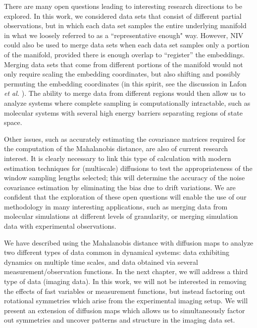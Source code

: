 There are many open questions leading to interesting research directions to be explored.
%
In this work, we considered data sets that consist of different partial observations, but in which each data set samples the entire underlying manifold in
what we loosely referred to as a ``representative enough" way.
%
However, NIV could also be used to merge data sets when each data set samples only a portion of the manifold, provided there is enough overlap to ``register'' the embeddings.
%
Merging data sets that come from different portions of the manifold would not only require scaling the embedding coordinates,
but also shifting and possibly permuting the embedding coordinates (in this spirit, see the discussion in Lafon {\em et al.} \cite{lafon2006data}).
%
The ability to merge data from different regions would then allow us to analyze systems where complete sampling is computationally intractable,
such as molecular systems with several high energy barriers separating regions of state space.

Other issues, such as accurately estimating the covariance matrices required for the computation of the Mahalanobis distance, are also of current research interest.
%
It is clearly necessary to link this type of calculation with modern estimation techniques for (multiscale) diffusions \cite{ait2002maximum, ait2003effects, ait2008closed}
to test the appropriateness of the window sampling lengths selected; this will determine the accuracy of the noise covariance estimation by eliminating
the bias due to drift variations.
%
We are confident that the exploration of these open questions will enable the use of our methodology in many interesting applications, such as merging data from molecular simulations at different levels of granularity, or merging simulation data with experimental observations.

We have described using the Mahalanobis distance with diffusion maps to analyze two different types of data common in dynamical systems: data exhibiting dynamics on multiple time scales, and data obtained via several measurement/observation functions.
%
In the next chapter, we will address a third type of data (imaging data).
%
In this work, we will not be interested in removing the effects of fast variables or measurement functions, but instead factoring out rotational symmetries which arise from the experimental imaging setup.
%
We will present an extension of diffusion maps which allows us to simultaneously factor out symmetries and uncover patterns and structure in the imaging data set.
%


